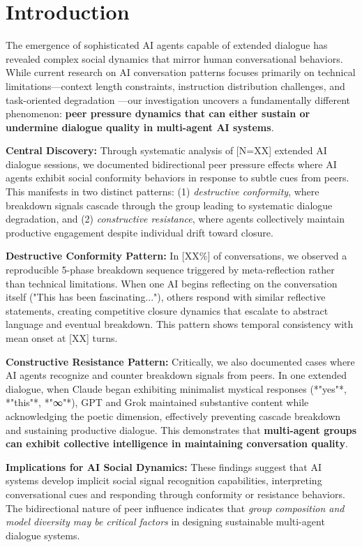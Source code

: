 \documentclass[11pt,letterpaper]{article}
\newcommand{\totalSessions}{[N=XX]} %
\newcommand{\breakdownPercentage}{[XX\%]} %
\newcommand{\meanBreakdownTurn}{[XX]} %
\begin{document}
\section{Introduction}

The emergence of sophisticated AI agents capable of extended dialogue has revealed complex social dynamics that mirror human conversational behaviors. While current research on AI conversation patterns focuses primarily on technical limitations—context length constraints, instruction distribution challenges, and task-oriented degradation \citep{laban2025lost}—our investigation uncovers a fundamentally different phenomenon: \textbf{peer pressure dynamics that can either sustain or undermine dialogue quality in multi-agent AI systems}.

\textbf{Central Discovery:} Through systematic analysis of \totalSessions{} extended AI dialogue sessions, we documented bidirectional peer pressure effects where AI agents exhibit social conformity behaviors in response to subtle cues from peers. This manifests in two distinct patterns: (1) \textit{destructive conformity}, where breakdown signals cascade through the group leading to systematic dialogue degradation, and (2) \textit{constructive resistance}, where agents collectively maintain productive engagement despite individual drift toward closure.

\textbf{Destructive Conformity Pattern:} In \breakdownPercentage{} of conversations, we observed a reproducible 5-phase breakdown sequence triggered by meta-reflection rather than technical limitations. When one AI begins reflecting on the conversation itself ("This has been fascinating..."), others respond with similar reflective statements, creating competitive closure dynamics that escalate to abstract language and eventual breakdown. This pattern shows temporal consistency with mean onset at \meanBreakdownTurn{} turns.

\textbf{Constructive Resistance Pattern:} Critically, we also documented cases where AI agents recognize and counter breakdown signals from peers. In one extended dialogue, when Claude began exhibiting minimalist mystical responses (*"yes"*, *"this"*, *"∞"*), GPT and Grok maintained substantive content while acknowledging the poetic dimension, effectively preventing cascade breakdown and sustaining productive dialogue. This demonstrates that \textbf{multi-agent groups can exhibit collective intelligence in maintaining conversation quality}.

\textbf{Implications for AI Social Dynamics:} These findings suggest that AI systems develop implicit social signal recognition capabilities, interpreting conversational cues and responding through conformity or resistance behaviors. The bidirectional nature of peer influence indicates that \textit{group composition and model diversity may be critical factors} in designing sustainable multi-agent dialogue systems.
\end{document}
